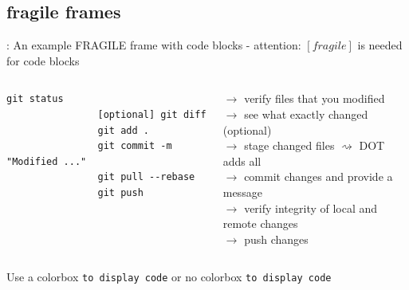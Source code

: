 \subsection{fragile frames}
\begin{frame}[fragile]{\secname: \subsecname}
	An example FRAGILE frame with code blocks - attention: $[fragile]$ is needed for code blocks
	\begin{columns}[T]
		\begin{column}{.48\textwidth}
			\begin{lstlisting}[numbers=none]
				git status
				[optional] git diff
				git add .
				git commit -m "Modified ..."
				git pull --rebase
				git push
			\end{lstlisting}
		\end{column}
		\begin{column}{0.48\textwidth}
			\vspace{-0.18cm}
			\begin{tcolorbox}[colback=green_warm, colframe=orange!20!white, bottom=0mm, middle=0mm, boxsep=0.2mm, opacityframe=0.8, opacityfill=0.2, size=fbox]
				$\rightarrow$ verify files that you modified\vspace{0.09cm}\\\vspace{0.09cm}
				$\rightarrow$ see what exactly changed (optional)\\\vspace{0.09cm}
				$\rightarrow$ stage changed files $\rightsquigarrow$ DOT adds all	\\	\vspace{0.09cm}	
				$\rightarrow$ commit changes and provide a message \\\vspace{0.09cm}
				$\rightarrow$ verify integrity of local and remote changes\\\vspace{0.09cm}
				$\rightarrow$ push changes\vspace{0.2cm}
			\end{tcolorbox}
		\end{column}
	\end{columns}
	\begin{tcolorbox}[colbacktitle=gray!45!white, colback=gray!25!white, fonttitle=\bfseries, standard jigsaw,colframe=gray!25!white, bottom=0mm, middle=0mm, boxsep=0.2mm, opacityframe=0.5, opacityfill=0.7, opacitybacktitle=0.95, title filled, title=Inline code blocks, size=fbox]	
		\textcolor{green_warm}{	
			Use a colorbox \colorbox{black!80!blue}{\lstinline{to display code}} or no colorbox \lstinline{to display code}
		}
	\end{tcolorbox}
\end{frame}

